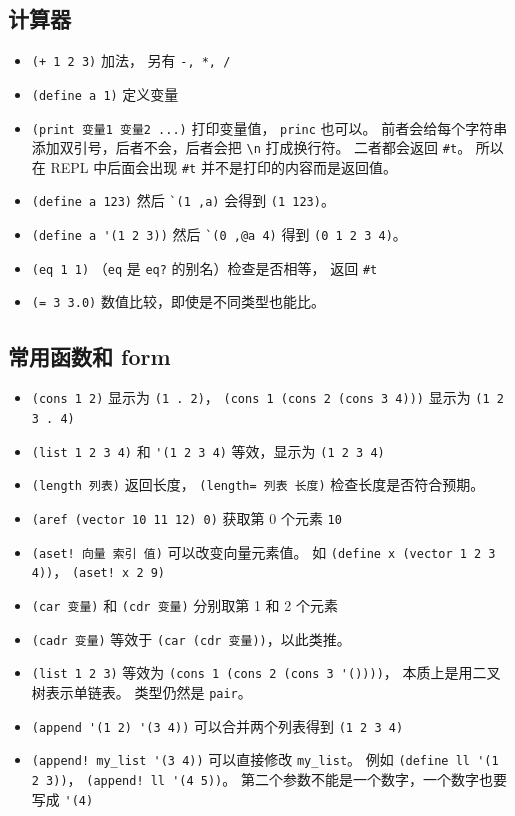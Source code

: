 \subsection{计算器}
\begin{itemize}
\item \verb`(+ 1 2 3)` 加法， 另有 \verb`-, *, /`
\item \verb`(define a 1)` 定义变量
\item \verb`(print 变量1 变量2 ...)` 打印变量值， \verb`princ` 也可以。 前者会给每个字符串添加双引号，后者不会，后者会把 \verb`\n` 打成换行符。 二者都会返回 \verb`#t`。 所以在 REPL 中后面会出现 \verb`#t` 并不是打印的内容而是返回值。
\item \verb`(define a 123)` 然后 \verb|`(1 ,a)| 会得到 \verb`(1 123)`。
\item \verb`(define a '(1 2 3))` 然后 \verb|`(0 ,@a 4)| 得到 \verb`(0 1 2 3 4)`。
\item \verb`(eq 1 1)` （\verb`eq` 是 \verb`eq?` 的别名）检查是否相等， 返回 \verb`#t`
\item \verb`(= 3 3.0)` 数值比较，即使是不同类型也能比。
\end{itemize}

\subsection{常用函数和 form}
\begin{itemize}
\item \verb`(cons 1 2)` 显示为 \verb`(1 . 2)`， \verb`(cons 1 (cons 2 (cons 3 4)))` 显示为 \verb`(1 2 3 . 4)`
\item \verb`(list 1 2 3 4)` 和 \verb`'(1 2 3 4)` 等效，显示为 \verb`(1 2 3 4)`
\item \verb`(length 列表)` 返回长度， \verb`(length= 列表 长度)` 检查长度是否符合预期。
\item \verb`(aref (vector 10 11 12) 0)` 获取第 0 个元素 \verb`10`
\item \verb`(aset! 向量 索引 值)` 可以改变向量元素值。 如 \verb`(define x (vector 1 2 3 4))`， \verb`(aset! x 2 9)`
\item \verb`(car 变量)` 和 \verb`(cdr 变量)` 分别取第 1 和 2 个元素
\item \verb`(cadr 变量)` 等效于 \verb`(car (cdr 变量))`，以此类推。
\item \verb`(list 1 2 3)` 等效为 \verb`(cons 1 (cons 2 (cons 3 '())))`， 本质上是用二叉树表示单链表。 类型仍然是 \verb`pair`。
\item \verb`(append '(1 2) '(3 4))` 可以合并两个列表得到 \verb`(1 2 3 4)`
\item \verb`(append! my_list '(3 4))` 可以直接修改 \verb`my_list`。 例如 \verb`(define ll '(1 2 3))`， \verb`(append! ll '(4 5))`。 第二个参数不能是一个数字，一个数字也要写成 \verb`'(4)`
\end{itemize}

